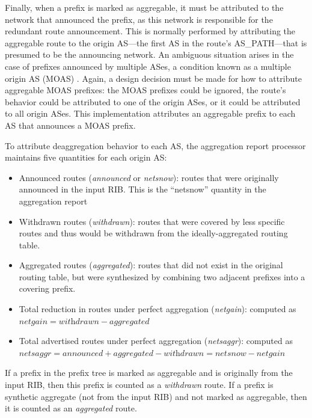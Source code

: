 
Finally, when a prefix is marked as aggregable, it must be attributed to the
network that announced the prefix, as this network is responsible for the
redundant route announcement. This is normally performed by attributing the
aggregable route to the origin AS---the first AS in the route's AS\_PATH---that
is presumed to be the announcing network. An ambiguous situation arises in the
case of prefixes announced by multiple ASes, a condition known as a multiple
origin AS (MOAS) \cite{Zhao:2001ly}. Again, a design decision must be made for
how to attribute aggregable MOAS prefixes: the MOAS prefixes could be ignored,
the route's behavior could be attributed to one of the origin ASes, or it could
be attributed to all origin ASes. This implementation attributes an aggregable
prefix to each AS that announces a MOAS prefix.

To attribute deaggregation behavior to each AS, the aggregation report
processor maintains five quantities for each origin AS:

\begin{itemize}
    \item{Announced routes (\emph{announced} or \emph{netsnow}): routes that
    were originally announced in the input RIB. This is the ``netsnow''
    quantity in the aggregation report}
    \item{Withdrawn routes (\emph{withdrawn}): routes that were covered by
    less specific routes and thus would be withdrawn from the
    ideally-aggregated routing table.}
    \item{Aggregated routes (\emph{aggregated}): routes that did not exist in
    the original routing table, but were synthesized by combining two adjacent
    prefixes into a covering prefix.}
    \item{Total reduction in routes under perfect aggregation (\emph{netgain}):
    computed as\\
    $\textit{netgain} = \textit{withdrawn} - \textit{aggregated}$}
    \item{Total advertised routes under perfect aggregation (\emph{netsaggr}):
    computed as\\
    $\textit{netsaggr}=\textit{announced} + \textit{aggregated} -
    \textit{withdrawn} = \textit{netsnow} - \textit{netgain}$}
\end{itemize}

If a prefix in the prefix tree is marked as aggregable and is originally from
the input RIB, then this prefix is counted as a \emph{withdrawn} route. If a
prefix is synthetic aggregate (not from the input RIB) and not marked as
aggregable, then it is counted as an \emph{aggregated} route.

